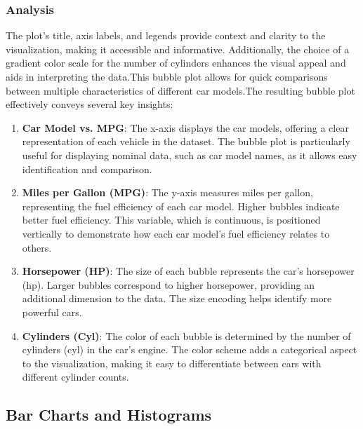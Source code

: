 \documentclass{article}\usepackage[]{graphicx}\usepackage[]{xcolor}
\begin{document}
\subsubsection{Analysis}
The plot's title, axis labels, and legends provide context and clarity to the visualization, making it accessible and informative. Additionally, the choice of a gradient color scale for the number of cylinders enhances the visual appeal and aids in interpreting the data.This bubble plot allows for quick comparisons between multiple characteristics of different car models.The resulting bubble plot effectively conveys several key insights:
\begin{enumerate}
\item \textbf{Car Model vs. MPG}: The x-axis displays the car models, offering a clear representation of each vehicle in the dataset. The bubble plot is particularly useful for displaying nominal data, such as car model names, as it allows easy identification and comparison.
\item \textbf{Miles per Gallon (MPG)}: The y-axis measures miles per gallon, representing the fuel efficiency of each car model. Higher bubbles indicate better fuel efficiency. This variable, which is continuous, is positioned vertically to demonstrate how each car model's fuel efficiency relates to others.
\item \textbf{Horsepower (HP)}: The size of each bubble represents the car's horsepower (hp). Larger bubbles correspond to higher horsepower, providing an additional dimension to the data. The size encoding helps identify more powerful cars.
\item \textbf{Cylinders (Cyl)}: The color of each bubble is determined by the number of cylinders (cyl) in the car's engine. The color scheme adds a categorical aspect to the visualization, making it easy to differentiate between cars with different cylinder counts.
\end{enumerate}


\subsection{Bar Charts and Histograms}
\end{document}

